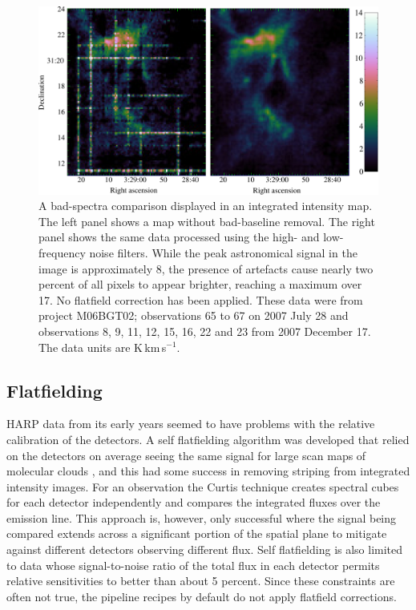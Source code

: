 \documentclass[a4paper,fleqn,usenatbib]{mnras}
\begin{document}
\begin{figure}
\includegraphics[width=\textwidth]{NGC1333_badbaseline_removal}
\caption{A bad-spectra comparison displayed in an integrated intensity map.
  The left panel shows a map without bad-baseline removal.  The right
  panel shows the same data processed using the high- and
  low-frequency noise filters.  While the peak astronomical signal in
  the image is approximately 8, the presence of artefacts cause nearly
  two percent of all pixels to appear brighter, reaching a maximum over 17.
  No flatfield correction has been applied. These data were from
  project M06BGT02; observations 65 to 67 on 2007 July 28 and
  observations 8, 9, 11, 12, 15, 16, 22 and 23 from 2007 December 17.
  The data units are K\,km\,s$^{-1}$.}
\label{fig:badbase:results}
\end{figure}

\subsection{Flatfielding}
\label{sec:flat}

HARP data from its early years seemed to have problems with the
relative calibration of the detectors.  A self flatfielding algorithm
was developed that relied on the detectors on average seeing the same
signal for large scan maps of molecular clouds
\citep{2010MNRAS.401..455C}, and this had some success in removing
striping from integrated intensity images.  For an observation the
Curtis technique creates spectral cubes for each detector
independently and compares the integrated fluxes over the emission
line.  This approach is, however, only successful where the signal
being compared extends across a significant portion of the spatial
plane to mitigate against different detectors observing different
flux.  Self flatfielding is also limited to data whose signal-to-noise
ratio of the total flux in each detector permits relative
sensitivities to better than about 5 percent.  Since these constraints
are often not true, the pipeline recipes by default do not apply
flatfield corrections.
\end{document}

